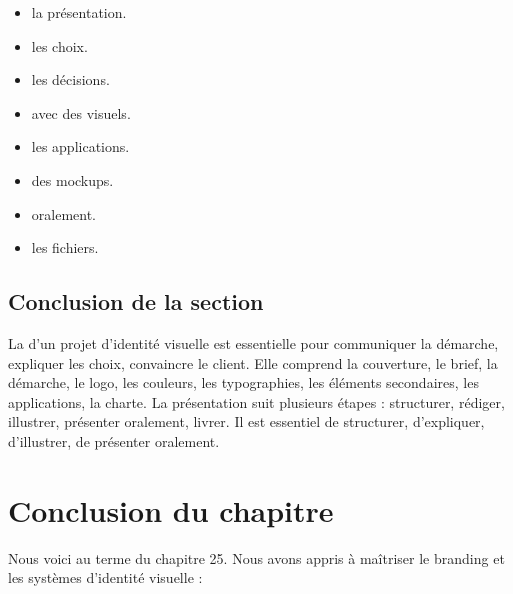 \begin{itemize}
    \item {} la présentation.
    \item {} les choix.
    \item {} les décisions.
    \item {} avec des visuels.
    \item {} les applications.
    \item {} des mockups.
    \item {} oralement.
    \item {} les fichiers.
\end{itemize}

\subsection*{Conclusion de la section}

La  d'un projet d'identité visuelle est essentielle pour communiquer la démarche, expliquer les choix, convaincre le client. Elle comprend la couverture, le brief, la démarche, le logo, les couleurs, les typographies, les éléments secondaires, les applications, la charte. La présentation suit plusieurs étapes : structurer, rédiger, illustrer, présenter oralement, livrer. Il est essentiel de structurer, d'expliquer, d'illustrer, de présenter oralement.

\section*{Conclusion du chapitre}

Nous voici au terme du chapitre 25. Nous avons appris à maîtriser le branding et les systèmes d'identité visuelle :

